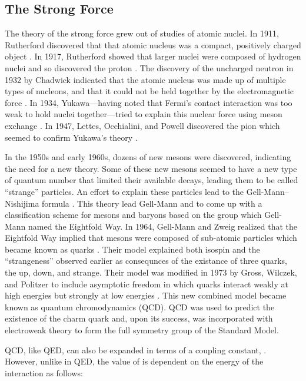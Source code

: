 \subsection{The Strong Force}
\label{ssec:strong_force}

The theory of the strong force grew out of studies of atomic nuclei. In 1911,
Rutherford discovered that that atomic nucleus was a compact, positively
charged object \cite{rutherford1911}. In 1917, Rutherford showed that larger
nuclei were composed of hydrogen nuclei and so discovered the proton
\cite{rutherford1919}. The discovery of the uncharged neutron in 1932 by
Chadwick indicated that the atomic nucleus was made up of multiple types of
nucleons, and that it could not be held together by the electromagnetic force
\cite{chadwick1932}. In 1934, Yukawa---having noted that Fermi's contact
interaction was too weak to hold nuclei together---tried to explain this
nuclear force using meson exchange \cite{yukawa1935}. In 1947, Lettes,
Occhialini, and Powell discovered the pion which seemed to confirm Yukawa's
theory \cite{lattes1947}.

In the 1950s and early 1960s, dozens of new mesons were discovered, indicating
the need for a new theory. Some of these new mesons seemed to have a new type
of quantum number that limited their available decays, leading them to be
called ``strange'' particles. An effort to explain these particles lead to the
Gell-Mann--Nishijima formula
\cite{nakano1953}\cite{nishijima1955}\cite{gellmann1956}. This theory lead
Gell-Mann and \Neeman to come up with a classification scheme for mesons and
baryons based on the \SUthree group which Gell-Mann named the Eightfold Way. In
1964, Gell-Mann and Zweig realized that the Eightfold Way implied that mesons
were composed of sub-atomic particles which became known as quarks
\cite{gellmann1964}\cite{zweig1964}. Their model explained both isospin and the
``strangeness'' observed earlier as consequnces of the existance of three
quarks, the up, down, and strange. Their model was modified in 1973 by Gross,
Wilczek, and Politzer to include asymptotic freedom in which quarks interact
weakly at high energies but strongly at low energies
\cite{gross_1973}\cite{politzer_1973}. This new combined model became known as
quantum chromodynamics (QCD). QCD was used to predict the existence of the
charm quark and, upon its success, was incorporated with electroweak theory to
form the full \SUthreeSUtwoUone symmetry group of the Standard Model.

QCD, like QED, can also be expanded in terms of a coupling constant,
\alphastrong. However, unlike \fsc in QED, the value of \alphastrong is
dependent on the energy of the interaction as follows:

